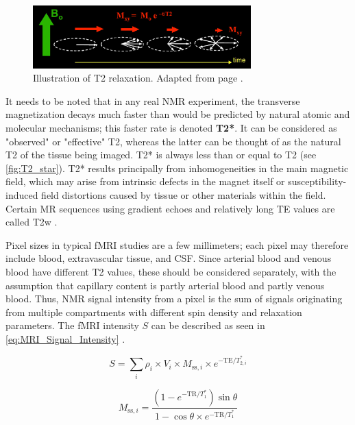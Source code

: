 \begin{figure}[htbp]
    \centering
    \includegraphics[width = 0.75\textwidth]{assets/images/T2_illustration.jpg}
    \caption[T2 Relaxation]{Illustration of T2 relaxation. Adapted from page \cite{T2}.}
    \label{fig:T2}
\end{figure}

It needs to be noted that in any real \gls{NMR} experiment, the transverse magnetization decays much faster than would be predicted by natural atomic and molecular mechanisms; this faster rate is denoted \textbf{T2*}. It can be considered as "observed" or "effective" T2, whereas the latter can be thought of as the natural T2 of the tissue being imaged. T2* is always less than or equal to T2 (see \autoref{fig:T2_star}). T2* results principally from inhomogeneities in the main magnetic field, which may arise from intrinsic defects in the magnet itself or susceptibility-induced field distortions caused by tissue or other materials within the field. Certain \gls{MR} sequences using gradient echoes and relatively long \gls{TE} values are called \gls{T2w} \cite{T2_star}.

Pixel sizes in typical \gls{fMRI} studies are a few millimeters; each pixel may therefore include blood, extravascular tissue, and \gls{CSF}. Since arterial blood and venous blood have different T2 values, these should be considered separately, with the assumption that capillary content is partly arterial blood and partly venous blood. Thus, \gls{NMR} signal intensity from a pixel is the sum of signals originating from multiple compartments with different spin density and relaxation parameters. The \gls{fMRI} intensity $S$ can be described as seen in \autoref{eq:MRI_Signal_Intensity} \cite{Kim2012}.

\begin{equation}
	\label{eq:MRI_Signal_Intensity}
	S = \sum_i \rho_i \times V_i \times M_{\text{ss},i} \times e^{-\text{TE}/T_{2,i}^*}
\end{equation}

\begin{equation}
	\label{eq:ss_magnetization}
	\displaystyle M_{\text{ss},i} = \frac{\left(1 - e^{-\text{TR}/T_1^*}\right) \sin\theta}{1 - \cos\theta \times e^{-\text{TR}/T_1^*}}
\end{equation}

